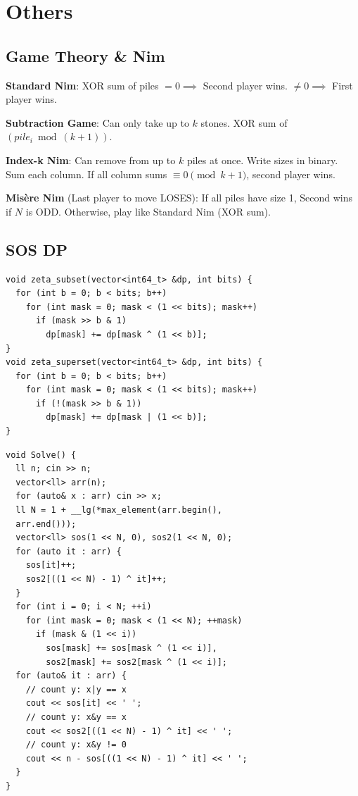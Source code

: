\section{Others}
\subsection{Game Theory \texorpdfstring{\&}{&} Nim}

\textbf{Standard Nim}: XOR sum of piles $= 0 \implies$ Second player wins. $\neq 0 \implies$ First player wins.

\textbf{Subtraction Game}: Can only take up to $k$ stones. XOR sum of $(pile_i \bmod (k+1))$.

\textbf{Index-k Nim}: Can remove from up to $k$ piles at once. Write sizes in binary. Sum each column. If all column sums $\equiv 0 \pmod{k+1}$, second player wins.

\textbf{Mis\`{e}re Nim} (Last player to move LOSES): If all piles have size 1, Second wins if $N$ is ODD. Otherwise, play like Standard Nim (XOR sum).

\subsection{SOS DP}
\begin{verbatim}
void zeta_subset(vector<int64_t> &dp, int bits) {
  for (int b = 0; b < bits; b++)
    for (int mask = 0; mask < (1 << bits); mask++)
      if (mask >> b & 1)
        dp[mask] += dp[mask ^ (1 << b)];
}
void zeta_superset(vector<int64_t> &dp, int bits) {
  for (int b = 0; b < bits; b++)
    for (int mask = 0; mask < (1 << bits); mask++)
      if (!(mask >> b & 1))
        dp[mask] += dp[mask | (1 << b)];
}
\end{verbatim}
\begin{verbatim}
void Solve() {
  ll n; cin >> n;
  vector<ll> arr(n);
  for (auto& x : arr) cin >> x;
  ll N = 1 + __lg(*max_element(arr.begin(),
  arr.end()));
  vector<ll> sos(1 << N, 0), sos2(1 << N, 0);
  for (auto it : arr) {
    sos[it]++;
    sos2[((1 << N) - 1) ^ it]++;
  }
  for (int i = 0; i < N; ++i)
    for (int mask = 0; mask < (1 << N); ++mask)
      if (mask & (1 << i))
        sos[mask] += sos[mask ^ (1 << i)],
        sos2[mask] += sos2[mask ^ (1 << i)];
  for (auto& it : arr) {
    // count y: x|y == x
    cout << sos[it] << ' ';
    // count y: x&y == x
    cout << sos2[((1 << N) - 1) ^ it] << ' ';
    // count y: x&y != 0
    cout << n - sos[((1 << N) - 1) ^ it] << ' ';
  }
}
\end{verbatim}
